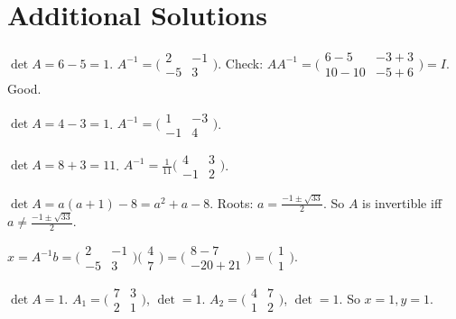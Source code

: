\section{Additional Solutions}

\begin{solutions}
    \item $\det A = 6 - 5 = 1$. $A^{-1} = \bigl(\begin{smallmatrix} 2 & -1 \\ -5 & 3 \end{smallmatrix}\bigr)$. Check: $A A^{-1} = \bigl(\begin{smallmatrix} 6 - 5 & -3 + 3 \\ 10 - 10 & -5 + 6 \end{smallmatrix}\bigr) = I$. Good.
    \item $\det A = 4 - 3 = 1$. $A^{-1} = \bigl(\begin{smallmatrix} 1 & -3 \\ -1 & 4 \end{smallmatrix}\bigr)$.
    \item $\det A = 8 + 3 = 11$. $A^{-1} = \tfrac{1}{11}\bigl(\begin{smallmatrix} 4 & 3 \\ -1 & 2 \end{smallmatrix}\bigr)$.
    \item $\det A = a(a + 1) - 8 = a^{2} + a - 8$. Roots: $a = \tfrac{-1 \pm \sqrt{33}}{2}$. So $A$ is invertible iff $a \neq \tfrac{-1 \pm \sqrt{33}}{2}$.
    \item $x = A^{-1} b = \bigl(\begin{smallmatrix} 2 & -1 \\ -5 & 3 \end{smallmatrix}\bigr)\bigl(\begin{smallmatrix} 4 \\ 7 \end{smallmatrix}\bigr) = \bigl(\begin{smallmatrix} 8 - 7 \\ -20 + 21 \end{smallmatrix}\bigr) = \bigl(\begin{smallmatrix} 1 \\ 1 \end{smallmatrix}\bigr)$.
    \item $\det A = 1$. $A_{1} = \bigl(\begin{smallmatrix} 7 & 3 \\ 2 & 1 \end{smallmatrix}\bigr)$, $\det = 1$. $A_{2} = \bigl(\begin{smallmatrix} 4 & 7 \\ 1 & 2 \end{smallmatrix}\bigr)$, $\det = 1$. So $x = 1, y = 1$.

\end{solutions}
